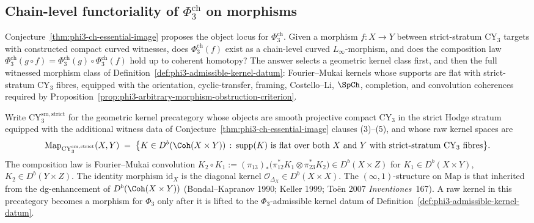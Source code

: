\subsection{Chain-level functoriality of \texorpdfstring{$\Phi_3^{\mathrm{ch}}$}{Phi-3-()ch} on morphisms}
\label{subsec:phi3-ch-functoriality-morphisms}

Conjecture~\ref{thm:phi3-ch-essential-image} proposes the object locus for $\Phi_3^{\mathrm{ch}}$. Given a morphism $f \colon X \to Y$ between strict-stratum CY$_3$ targets with constructed compact curved witnesses, does $\Phi_3^{\mathrm{ch}}(f)$ exist as a chain-level curved $L_\infty$-morphism, and does the composition law $\Phi_3^{\mathrm{ch}}(g \circ f) = \Phi_3^{\mathrm{ch}}(g) \circ \Phi_3^{\mathrm{ch}}(f)$ hold up to coherent homotopy? The answer selects a geometric kernel class first, and then the full witnessed morphism class of Definition~\ref{def:phi3-admissible-kernel-datum}: Fourier--Mukai kernels whose supports are flat with strict-stratum CY$_3$ fibres, equipped with the orientation, cyclic-transfer, framing, Costello--Li, $\SpCh$, completion, and convolution coherences required by Proposition~\ref{prop:phi3-arbitrary-morphism-obstruction-criterion}.

\begin{definition}
\label{def:cy3-strict-infty-category}
Write $\mathrm{CY}_3^{\mathrm{sm,strict}}$ for the geometric kernel
precategory whose objects are smooth projective compact CY$_3$ in the
strict Hodge stratum equipped with the additional witness data of
Conjecture~\ref{thm:phi3-ch-essential-image} clauses
\textup{(3)--(5)}, and whose raw kernel spaces are
\[
 \mathrm{Map}_{\mathrm{CY}_3^{\mathrm{sm,strict}}}(X, Y) \;=\; \bigl\{K \in D^b(\Coh(X \times Y)) \,:\, \mathrm{supp}(K) \text{ is flat over both } X \text{ and } Y \text{ with strict-stratum CY}_3 \text{ fibres}\bigr\}.
\]
The composition law is Fourier--Mukai convolution $K_2 \circ K_1 := (\pi_{13})_*\bigl(\pi_{12}^* K_1 \otimes \pi_{23}^* K_2\bigr) \in D^b(X \times Z)$ for $K_1 \in D^b(X \times Y)$, $K_2 \in D^b(Y \times Z)$. The identity morphism $\mathrm{id}_X$ is the diagonal kernel $\mathcal{O}_{\Delta_X} \in D^b(X \times X)$. The $(\infty,1)$-structure on $\mathrm{Map}$ is that inherited from the dg-enhancement of $D^b(\Coh(X \times Y))$ (Bondal--Kapranov 1990; Keller 1999; To\"en 2007 \textit{Inventiones}~167). A raw kernel in this precategory becomes a morphism for $\Phi_3$ only after it is lifted to the $\Phi_3$-admissible kernel datum of Definition~\ref{def:phi3-admissible-kernel-datum}.
\end{definition}

